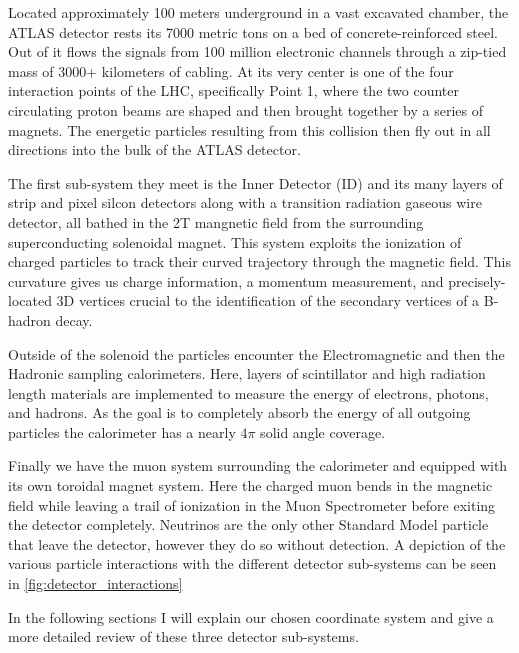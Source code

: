 Located approximately 100 meters underground in a vast excavated chamber, the
ATLAS detector rests its 7000 metric tons on a bed of concrete-reinforced
steel.  Out of it flows the signals from 100 million electronic channels
through a zip-tied mass of 3000+ kilometers of cabling.  At its very center is
one of the four interaction points of the LHC, specifically Point 1, where the
two counter circulating proton beams are shaped and then brought together by a
series of magnets.  The energetic particles resulting from this collision then
fly out in all directions into the bulk of the ATLAS detector.

The first sub-system they meet is the Inner Detector (ID) and its many layers of
strip and pixel silcon detectors along with a transition radiation gaseous wire
detector, all bathed in the 2T mangnetic field from the surrounding superconducting
solenoidal magnet.  This system exploits the ionization of charged particles to
track their curved trajectory through the magnetic field.  This curvature gives
us charge information, a momentum measurement, and precisely-located 3D vertices
crucial to the identification of the secondary vertices of a B-hadron decay. 

Outside of the solenoid the particles encounter the Electromagnetic and then
the Hadronic sampling calorimeters. Here, layers of scintillator and high
radiation length materials are implemented to measure the energy of electrons,
photons, and hadrons. As the goal is to completely absorb the energy of all
outgoing particles the calorimeter has a nearly $4\pi$ solid angle coverage.

Finally we have the muon system surrounding the calorimeter and equipped with
its own toroidal magnet system.  Here the charged muon bends in the magnetic
field while leaving a trail of ionization in the Muon Spectrometer before
exiting the detector completely.  Neutrinos are the only other Standard Model
particle that leave the detector, however they do so without detection.  A
depiction of the various particle interactions with the different detector
sub-systems can be seen in \cref{fig:detector_interactions}

In the following sections I will explain our chosen coordinate system and give 
a more detailed review of these three detector sub-systems.

